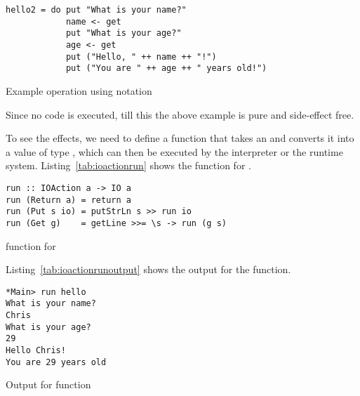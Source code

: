 \documentclass[thesis-solanki.tex]{subfiles}
\begin{document}
\begin{scope}
\begin{code-list}[H]
\begin{singlespace}
\begin{verbatim}
hello2 = do put "What is your name?"
            name <- get
            put "What is your age?"
            age <- get
            put ("Hello, " ++ name ++ "!")
            put ("You are " ++ age ++ " years old!")
\end{verbatim}
\end{singlespace}
\caption{Example operation using  notation}
\label{tab:ioactionexampledo}
\end{code-list}

Since no code is executed, till this the above example is pure and side-effect free.

To see the effects, we need to define a function that takes an   and converts it into a 
value of type  , which can then be executed by the interpreter or the runtime system. 
Listing~\ref{tab:ioactionrun} shows the  function for .


\begin{code-list}[H]
\begin{singlespace}
\begin{verbatim}
run :: IOAction a -> IO a
run (Return a) = return a
run (Put s io) = putStrLn s >> run io
run (Get g)    = getLine >>= \s -> run (g s)
\end{verbatim}
\end{singlespace}
\caption{ function for }
\label{tab:ioactionrun}
\end{code-list}

Listing~\ref{tab:ioactionrunoutput} shows the output for the  function.

\begin{code-list}[H]
\begin{singlespace}
\begin{verbatim}
*Main> run hello
What is your name?
Chris
What is your age?
29
Hello Chris!
You are 29 years old
\end{verbatim}
\end{singlespace}
\caption{Output for  function}
\label{tab:ioactionrunoutput}
\end{code-list}


\end{scope}
\end{document}
